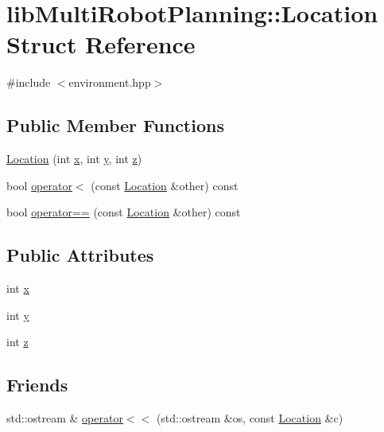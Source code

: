 \hypertarget{structlib_multi_robot_planning_1_1_location}{}\section{lib\+Multi\+Robot\+Planning\+:\+:Location Struct Reference}
\label{structlib_multi_robot_planning_1_1_location}


{\ttfamily \#include $<$environment.\+hpp$>$}

\subsection*{Public Member Functions}
\begin{DoxyCompactItemize}
\item 
\hyperlink{structlib_multi_robot_planning_1_1_location_a575f4c2a0b65829873bee62ab5a5ad96}{Location} (int \hyperlink{structlib_multi_robot_planning_1_1_location_a8b9baca7fdc69a97d8071666af608f82}{x}, int \hyperlink{structlib_multi_robot_planning_1_1_location_a83d2a4d9d01f2c12e2a567a86ca3893a}{y}, int \hyperlink{structlib_multi_robot_planning_1_1_location_a6c016b7c0360b6dee839189d91fdfd72}{z})
\item 
bool \hyperlink{structlib_multi_robot_planning_1_1_location_abe04a4c39f478d6dbfdbbb12fe70253a}{operator$<$} (const \hyperlink{structlib_multi_robot_planning_1_1_location}{Location} \&other) const
\item 
bool \hyperlink{structlib_multi_robot_planning_1_1_location_a2f795f653c6e0a2943eff4b8f42fe5fc}{operator==} (const \hyperlink{structlib_multi_robot_planning_1_1_location}{Location} \&other) const
\end{DoxyCompactItemize}
\subsection*{Public Attributes}
\begin{DoxyCompactItemize}
\item 
int \hyperlink{structlib_multi_robot_planning_1_1_location_a8b9baca7fdc69a97d8071666af608f82}{x}
\item 
int \hyperlink{structlib_multi_robot_planning_1_1_location_a83d2a4d9d01f2c12e2a567a86ca3893a}{y}
\item 
int \hyperlink{structlib_multi_robot_planning_1_1_location_a6c016b7c0360b6dee839189d91fdfd72}{z}
\end{DoxyCompactItemize}
\subsection*{Friends}
\begin{DoxyCompactItemize}
\item 
std\+::ostream \& \hyperlink{structlib_multi_robot_planning_1_1_location_a80d23d3abaf3e34d1cb5202feb05f385}{operator$<$$<$} (std\+::ostream \&os, const \hyperlink{structlib_multi_robot_planning_1_1_location}{Location} \&c)
\end{DoxyCompactItemize}


